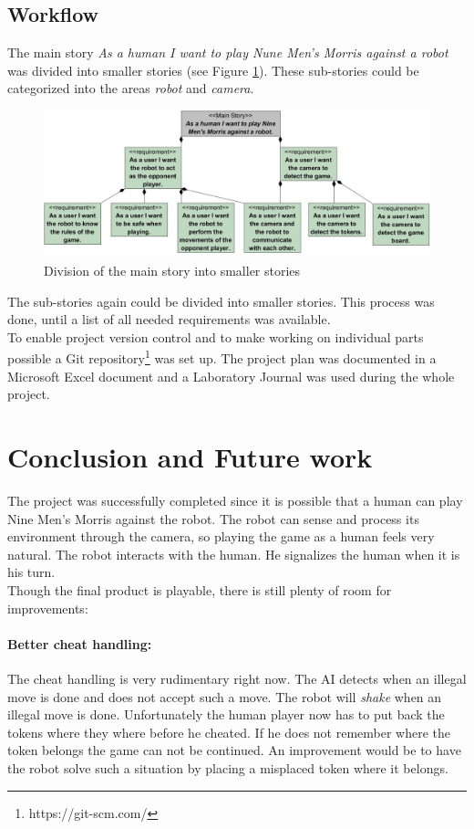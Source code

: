 \documentclass[a4paper]{spie}  %
\begin{document}
\begin{large}
\subsection{Workflow}
The main story \emph{As a human I want to play Nune Men's Morris against a robot} was divided into smaller stories (see Figure \ref{stories}). These sub-stories could be categorized into the areas \emph{robot} and \emph{camera}.
\begin{figure}[h]
\includegraphics[width=15cm]{images/stories.jpg}
\centering
\caption{Division of the main story into smaller stories}
\label{stories}
\end{figure}
The sub-stories again could be divided into smaller stories. This process was done, until a list of all needed requirements was available.\\
To enable project version control and to make working on individual parts possible a Git repository\footnote{https://git-scm.com/} was set up. The project plan was documented in a Microsoft Excel document and a Laboratory Journal was used during the whole project.
\clearpage
\section{Conclusion and Future work}
The project was successfully completed since it is possible that a human can play Nine Men's Morris against the robot. The robot can sense and process its environment through the camera, so playing the game as a human feels very natural. The robot interacts with the human. He signalizes the human when it is his turn. \\ 
Though the final product is playable, there is still plenty of room for improvements:
\paragraph{Better cheat handling:} The cheat handling is very rudimentary right now. The AI detects when an illegal move is done and does not accept such a move. The robot will \emph{shake} when an illegal move is done. Unfortunately the human player now has to put back the tokens where they where before he cheated. If he does not remember where the token belongs the game can not be continued. An improvement would be to have the robot solve such a situation by placing a misplaced token where it belongs.

\end{large}
\end{document}

